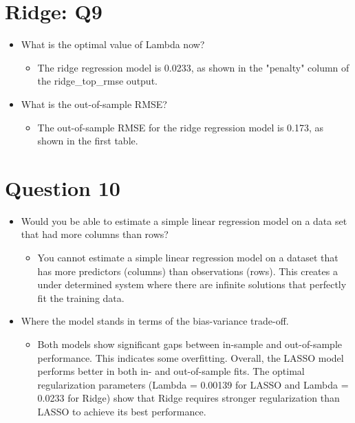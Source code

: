 \documentclass[12pt,letterpaper]{article}
\begin{document}
\section{Ridge: Q9}
\begin{itemize}
  \item What is the optimal value of Lambda now?
    \begin{itemize}
        \item  The ridge regression model is 0.0233, as shown in the "penalty" column of the ridge\_top\_rmse output. 
    \end{itemize}
    \item What is the out-of-sample RMSE? 
    \begin{itemize}
        \item The out-of-sample RMSE for the ridge regression model is 0.173, as shown in the first table.
    \end{itemize}
\end{itemize}

\section{Question 10}
\begin{itemize}
  \item Would you be able to estimate a simple linear regression model on a data set that had more columns than rows?
    \begin{itemize}
        \item You cannot estimate a simple linear regression model on a dataset that has more predictors (columns) than observations (rows). This creates a under determined system where there are infinite solutions that perfectly fit the training data. 
    \end{itemize}
    \item Where the model stands in terms of the bias-variance trade-off.
    \begin{itemize}
        \item Both models show significant gaps between in-sample and out-of-sample performance. This indicates some overfitting. Overall, the LASSO model performs better in both in- and out-of-sample fits. The optimal regularization parameters (Lambda = 0.00139 for LASSO and Lambda = 0.0233 for Ridge) show that Ridge requires stronger regularization than LASSO to achieve its best performance.
    \end{itemize}
\end{itemize}
\end{document}
